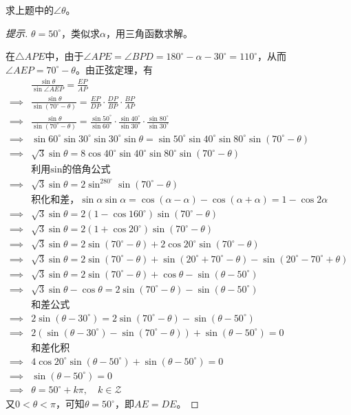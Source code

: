 \begin{example}
  求上题中的$\angle\theta$。
\end{example}
\begin{proof}[提示]
  $\theta=50^\circ$，类似求$\alpha$，用三角函数求解。

  在$\triangle APE$中，由于$\angle APE = \angle BPD = 180^\circ - \alpha - 30^\circ = 110^\circ$，从而$\angle AEP = 70^\circ - \theta$。由正弦定理，有
  \begin{align*}
    &\frac{\sin\theta}{\sin\angle AEP} = \frac{EP}{AP}\\[3pt]
    \implies&
        \frac{\sin\theta}{\sin(70^\circ -\theta)} =
        \frac{EP}{DP} \cdot \frac{DP}{BP} \cdot \frac{BP}{AP}\\
    \implies &
        \frac{\sin\theta}{\sin(70^\circ -\theta)} =
        \frac{\sin50^\circ}{\sin60^\circ} \cdot \frac{\sin40^\circ}{\sin30^\circ} \cdot \frac{\sin80^\circ}{\sin30^\circ}\\
    \implies &
        \sin60^\circ \sin30^\circ \sin30^\circ \sin\theta = \sin50^\circ\sin40^\circ\sin80^\circ\sin(70^\circ-\theta)\\
    \implies &
        \sqrt3\sin\theta = 8\cos40^\circ\sin40^\circ\sin80^\circ\sin(70^\circ-\theta)\\
    &\text{利用$\sin$的倍角公式}\\
    \implies & \sqrt3\sin\theta = 2\sin^280^\circ\sin(70^\circ-\theta)\\
    &\text{积化和差，} \sin\alpha\sin\alpha = \cos(\alpha-\alpha)-\cos(\alpha+\alpha) = 1-\cos2\alpha\\
    \implies & \sqrt3\sin\theta = 2(1-\cos160^\circ)\sin(70^\circ-\theta)\\
    \implies & \sqrt3\sin\theta = 2(1+\cos20^\circ)\sin(70^\circ-\theta)\\
    \implies & \sqrt3\sin\theta = 2\sin(70^\circ-\theta)+2\cos20^\circ\sin(70^\circ-\theta)\\
    \implies & \sqrt3\sin\theta = 2\sin(70^\circ-\theta)+\sin(20^\circ+70^\circ-\theta)-\sin(20^\circ-70^\circ+\theta)\\
    \implies & \sqrt3\sin\theta = 2\sin(70^\circ-\theta)+\cos\theta-\sin(\theta-50^\circ)\\
    \implies & \sqrt3\sin\theta -\cos\theta  = 2\sin(70^\circ-\theta)-\sin(\theta-50^\circ)\\
    &\text{和差公式}\\
    \implies & 2\sin(\theta-30^\circ) = 2\sin(70^\circ-\theta)-\sin(\theta-50^\circ)\\
    \implies & 2\left(\sin(\theta-30^\circ) -\sin(70^\circ-\theta)\right) + \sin(\theta-50^\circ) = 0\\
    &\text{和差化积}\\
    \implies & 4\cos20^\circ\sin(\theta-50^\circ) + \sin(\theta-50^\circ) = 0 \\
    \implies & \sin(\theta-50^\circ) = 0\\
    \implies & \theta = 50^\circ + k\pi,\quad k\in\mathcal{Z}
  \end{align*}
  又$0<\theta<\pi$，可知$\theta = 50^\circ$，即$AE=DE$。
\end{proof}